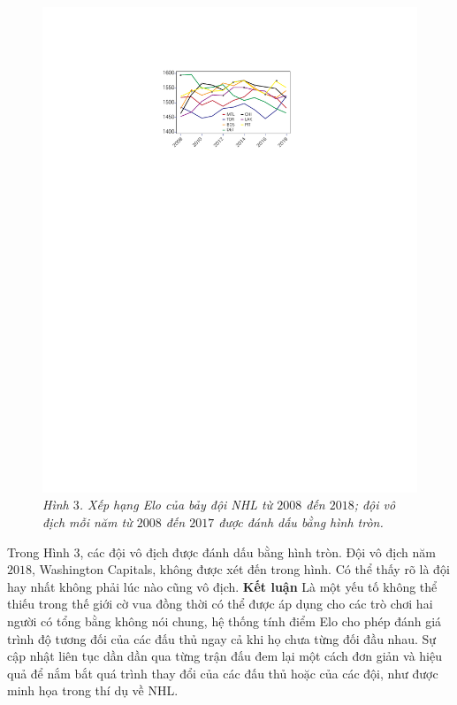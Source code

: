 \begin{multicols}{2}
\begin{figure}[H]
		\includegraphics[width= 1\linewidth]{pic4}
		\caption{\small\textit{\color{toanhocdoisong}Hình $3$. Xếp hạng Elo của bảy đội NHL từ $2008$ đến $2018$; đội vô địch mỗi năm từ $2008$ đến $2017$ được đánh dấu bằng hình tròn.}}
		\vspace*{-10pt}
	\end{figure}
	Trong Hình $3$, các đội vô địch được đánh dấu bằng hình tròn. Đội vô địch năm $2018$, Washington Capitals, không được xét đến trong hình. Có thể thấy rõ là đội hay nhất không phải lúc nào cũng vô địch.
	\vskip 0.05cm
	\textbf{\color{toanhocdoisong}Kết luận}
	\vskip 0.05cm
	Là một yếu tố không thể thiếu trong thế giới cờ vua đồng thời có thể được áp dụng cho các trò chơi hai người có tổng bằng không nói chung, hệ thống tính điểm Elo cho phép đánh giá trình độ tương đối của các đấu thủ ngay cả khi họ chưa từng đối đầu nhau. Sự cập nhật liên tục dần dần qua từng trận đấu đem lại một cách đơn giản và hiệu quả để nắm bắt quá trình thay đổi của các đấu thủ hoặc của các đội, như được minh họa trong thí dụ về NHL.
\end{multicols}